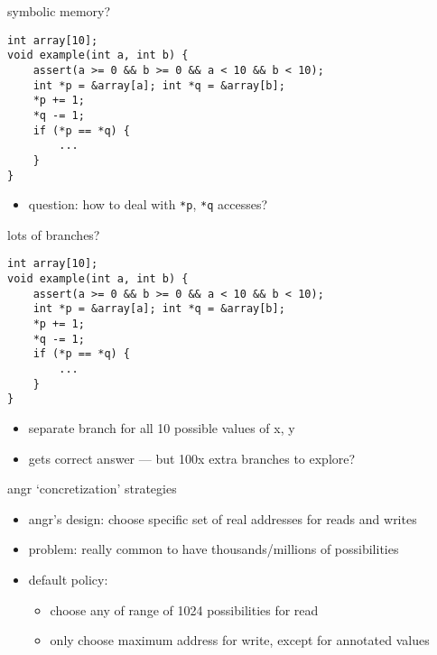 \begin{frame}[fragile]{symbolic memory?}
\begin{lstlisting}[style=smaller]
int array[10];
void example(int a, int b) {
    assert(a >= 0 && b >= 0 && a < 10 && b < 10);
    int *p = &array[a]; int *q = &array[b];
    *p += 1;
    *q -= 1;
    if (*p == *q) {
        ...
    }
}
\end{lstlisting}
\begin{itemize}
\item question: how to deal with \texttt{*p}, \texttt{*q} accesses?
\end{itemize}
\end{frame}

\begin{frame}[fragile]{lots of branches?}
\begin{lstlisting}[style=smaller]
int array[10];
void example(int a, int b) {
    assert(a >= 0 && b >= 0 && a < 10 && b < 10);
    int *p = &array[a]; int *q = &array[b];
    *p += 1;
    *q -= 1;
    if (*p == *q) {
        ...
    }
}
\end{lstlisting}
\begin{itemize}
\item separate branch for all 10 possible values of x, y
\item gets correct answer --- but 100x extra branches to explore?
\end{itemize}
\end{frame}

\begin{frame}{angr `concretization' strategies}
    \begin{itemize}
    \item angr's design: choose specific set of real addresses for reads and writes
    \item problem: really common to have thousands/millions of possibilities
    \vspace{.5cm}
    \item default policy:
        \begin{itemize}
        \item choose any of range of 1024 possibilities for read
        \item only choose maximum address for write, except for annotated values
        \end{itemize}
    \end{itemize}
\end{frame}

